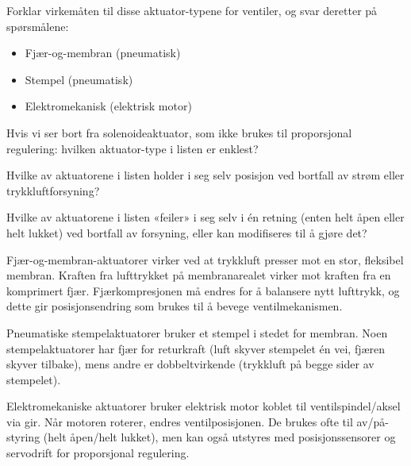 

Forklar virkemåten til disse aktuator-typene for ventiler, og svar deretter på spørsmålene:

\begin{itemize}
\item{} Fjær-og-membran (pneumatisk)
\item{} Stempel (pneumatisk)
\item{} Elektromekanisk (elektrisk motor)
\end{itemize}

\vskip 10pt

Hvis vi ser bort fra solenoideaktuator, som ikke brukes til proporsjonal regulering: hvilken aktuator-type i listen er enklest?

\vskip 10pt

Hvilke av aktuatorene i listen holder i seg selv posisjon ved bortfall av strøm eller trykkluftforsyning?

\vskip 10pt

Hvilke av aktuatorene i listen «feiler» i seg selv i én retning (enten helt åpen eller helt lukket) ved bortfall av forsyning, eller kan modifiseres til å gjøre det?







Fjær-og-membran-aktuatorer virker ved at trykkluft presser mot en stor, fleksibel membran. Kraften fra lufttrykket på membranarealet virker mot kraften fra en komprimert fjær. Fjærkompresjonen må endres for å balansere nytt lufttrykk, og dette gir posisjonsendring som brukes til å bevege ventilmekanismen.

\vskip 10pt

Pneumatiske stempelaktuatorer bruker et stempel i stedet for membran. Noen stempelaktuatorer har fjær for returkraft (luft skyver stempelet én vei, fjæren skyver tilbake), mens andre er dobbeltvirkende (trykkluft på begge sider av stempelet).

\vskip 10pt

Elektromekaniske aktuatorer bruker elektrisk motor koblet til ventilspindel/aksel via gir. Når motoren roterer, endres ventilposisjonen. De brukes ofte til av/på-styring (helt åpen/helt lukket), men kan også utstyres med posisjonssensorer og servodrift for proporsjonal regulering.

